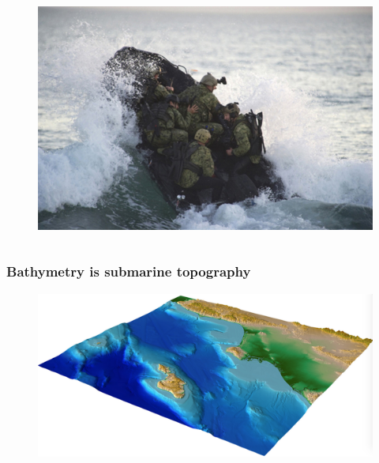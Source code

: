 \documentclass[7pt]{beamer}
\begin{document}
\begin{frame}
\begin{columns}
\begin{figure}
               		\includegraphics[width=1\linewidth]{img/Navy_S.jpg}
                \end{figure}       
        \end{columns}
\end{frame}


\begin{frame}
	\frametitle{Bathymetry is submarine topography}
		\begin{figure}[h]
			\includegraphics[width=1.\linewidth]{img/bath_topo_example.png}\hfill
		\end{figure}
\end{frame}
\end{document}
